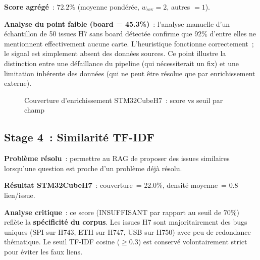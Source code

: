 \textbf{Score agrégé}~: $72.2\%$ (moyenne pondérée, $w_{\text{sev}}=2$, autres $=1$).

\textbf{Analyse du point faible (board = 45.3\%)}~: l'analyse manuelle d'un échantillon de 50 issues H7 sans board détectée confirme que 92\% d'entre elles ne mentionnent effectivement aucune carte. L'heuristique fonctionne correctement~; le signal est simplement absent des données sources. Ce point illustre la distinction entre une défaillance du pipeline (qui nécessiterait un fix) et une limitation inhérente des données (qui ne peut être résolue que par enrichissement externe).

\begin{figure}[H]
\centering
{}
\caption{Couverture d'enrichissement STM32CubeH7~: score vs seuil par champ}
\label{fig:eval_enrichment_chart}
\end{figure}

\subsection{Stage 4~: Similarité TF-IDF}
\label{sec:eval_stage4}

\textbf{Problème résolu}~: permettre au RAG de proposer des issues similaires lorsqu'une question est proche d'un problème déjà résolu.

\textbf{Résultat STM32CubeH7}~: couverture~= 22.0\%, densité moyenne~= 0.8 lien/issue.

\textbf{Analyse critique}~: ce score (INSUFFISANT par rapport au seuil de $70\%$) reflète la \textbf{spécificité du corpus}. Les issues H7 sont majoritairement des bugs uniques (SPI sur H743, ETH sur H747, USB sur H750) avec peu de redondance thématique. Le seuil TF-IDF cosine ($\geq 0.3$) est conservé volontairement strict pour éviter les faux liens.

